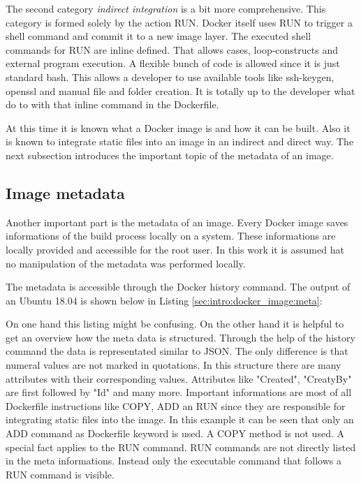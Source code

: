 The second category \textit{indirect integration} is a bit more comprehensive. This category is formed solely by the action RUN.
Docker itself uses RUN to trigger a shell command and commit it to a new image layer.
The executed shell commands for RUN are inline defined. That allows cases, loop-constructs and external program execution. A flexible bunch of code is allowed since it is just standard bash. This allows a developer to use available tools like ssh-keygen, openssl and manual file and folder creation. It is totally up to the developer what do to with that inline command in the Dockerfile. 

At this time it is known what a Docker image is and how it can be built. Also it is known to integrate static files into an image in an indirect and direct way. The next subsection introduces the important topic of the metadata of an image.

\subsection{Image metadata}
\label{sec:intro:docker_image:docker_img:meta}
Another important part is the metadata of an image. Every Docker image saves informations of the build process locally on a system.  
These informations are locally provided and accessible for the root user. 
In this work it is assumed hat no manipulation of the metadata was performed locally. 

The metadata is accessible through the Docker history command. The output of an Ubuntu 18.04 is shown below in Listing \ref{sec:intro:docker_image:meta}:

On one hand this listing might be confusing. On the other hand it is helpful to get an overview how the meta data is structured.
Through the help of the history command the data is representated similar to JSON. The only difference is that numeral values are not marked in quotations. In this structure there are many attributes with their corresponding values. Attributes like "Created", "CreatyBy" are first followed by "Id" and many more. 	
Important informations are most of all Dockerfile instructions like COPY, ADD an RUN since they are responsible for integrating static files into the image.
In this example it can be seen that only an ADD command as Dockerfile keyword is used. A COPY method is not used.
A special fact applies to the RUN command. RUN commands are not directly listed in the meta informations.
Instead only the executable command that follows a RUN command is visible.

